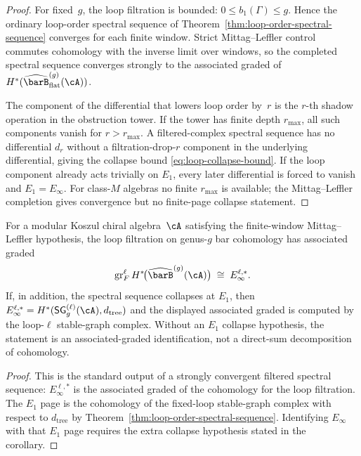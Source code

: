 \begin{proof}
For fixed~$g$, the loop filtration is bounded:
$0\leq b_1(\Gamma)\leq g$. Hence the ordinary loop-order spectral
sequence of Theorem~\ref{thm:loop-order-spectral-sequence}
converges for each finite window. Strict Mittag--Leffler control
commutes cohomology with the inverse limit over windows, so the
completed spectral sequence converges strongly to the associated
graded of $H^*(\widehat{\barB}^{(g)}_{\mathrm{flat}}(\cA))$.

The component of the differential that lowers loop order by~$r$ is
the $r$-th shadow operation in the obstruction tower. If the tower has
finite depth $r_{\max}$, all such components vanish for
$r>r_{\max}$. A filtered-complex spectral sequence has no
differential $d_r$ without a filtration-drop-$r$ component in the
underlying differential, giving the collapse bound
\eqref{eq:loop-collapse-bound}. If the loop component already acts
trivially on $E_1$, every later differential is forced to vanish and
$E_1=E_\infty$. For class-$M$ algebras no finite $r_{\max}$ is
available; the Mittag--Leffler completion gives convergence but no
finite-page collapse statement.
\end{proof}

\begin{corollary}\label{cor:loop-decomposition-bar}
For a modular Koszul chiral algebra~$\cA$ satisfying the
finite-window Mittag--Leffler hypothesis, the loop filtration on
genus-$g$ bar cohomology has associated graded
\begin{equation}\label{eq:loop-decomposition}
\operatorname{gr}^{\ell}_{F}
H^*\!\bigl(\widehat{\barB}^{(g)}(\cA)\bigr)
\;\cong\;
E_\infty^{\ell,*}.
\end{equation}
If, in addition, the spectral sequence collapses at $E_1$, then
$E_\infty^{\ell,*}=H^*(\mathsf{SG}_{g}^{(\ell)}(\cA),
d_{\mathrm{tree}})$ and the displayed associated graded is computed
by the loop-$\ell$ stable-graph complex. Without an $E_1$ collapse
hypothesis, the statement is an associated-graded identification, not
a direct-sum decomposition of cohomology.
\end{corollary}

\begin{proof}
This is the standard output of a strongly convergent filtered
spectral sequence: $E_\infty^{\ell,*}$ is the associated graded of
the cohomology for the loop filtration. The $E_1$ page is the
cohomology of the fixed-loop stable-graph complex with respect to
$d_{\mathrm{tree}}$ by
Theorem~\ref{thm:loop-order-spectral-sequence}. Identifying
$E_\infty$ with that $E_1$ page requires the extra collapse
hypothesis stated in the corollary.
\end{proof}

